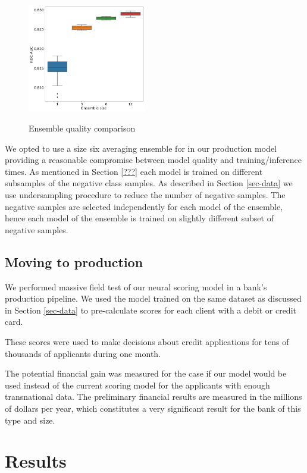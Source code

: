 \documentclass[sigconf]{acmart}
\begin{document}
\begin{figure}[ht]
  \caption{Ensemble quality comparison}
  \includegraphics[width=0.46\textwidth]{figures/ensemble-pic.png}
  \label{fig-ens}
\end{figure}

We opted to use a size six averaging ensemble for in our production model providing a reasonable compromise between model quality and training/inference times. As mentioned in Section \ref{???} each model is trained on different subsamples of the negative class samples. As described in Section \ref{sec-data} we use undersampling procedure to reduce the number of negative samples. The negative samples are selected independently for each model of the ensemble, hence each model of the ensemble is trained on slightly different subset of negative samples.

\subsection{Moving to production}

We performed massive field test of our neural scoring model in a bank's production pipeline. We used the model trained on the same dataset as discussed in Section \ref{sec-data} to pre-calculate scores for each client with a debit or credit card.

These scores were used to make decisions about credit applications for tens of thousands of applicants during one month.

The potential financial gain was measured for the case if our model would be used instead of the current scoring model for the applicants with enough transnational data. The preliminary financial results are measured in the millions of dollars per year, which constitutes a very significant result for the bank of this type and size.

\section{Results}
\end{document}
